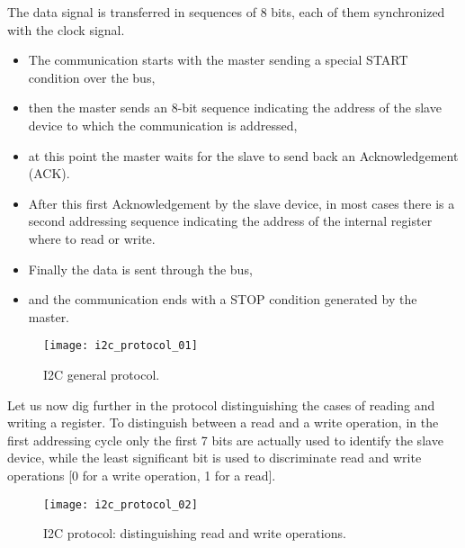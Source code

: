 The data signal is transferred in sequences of 8 bits, each of them synchronized with the clock signal.
\begin{itemize}
	\item The communication starts with the master sending a special START condition over the bus,
	\item then the master sends an 8-bit sequence indicating the address of the slave device to which the communication is addressed,
	\item at this point the master waits for the slave to send back an Acknowledgement (ACK).
	\item After this first Acknowledgement by the slave device, in most cases there is a second addressing sequence indicating the address of the internal register where to read or write.
	\item Finally the data is sent through the bus,
	\item and the communication ends with a STOP condition generated by the master.
\end{itemize}
\begin{figure}[!ht]
	\texttt{[image: i2c\_protocol\_01]}
	\captionsetup{justification=centering, margin=1.5cm}
	\centering
	\caption{I2C general protocol.}
	\centering
\end{figure}

Let us now dig further in the protocol distinguishing the cases of reading and writing a register. To distinguish between a read and a write operation, in the first addressing cycle only the first 7 bits are actually used to identify the slave device, while the least significant bit is used to discriminate read and write operations [0 for a write operation, 1 for a read].
\begin{figure}[!ht]
	\texttt{[image: i2c\_protocol\_02]}
	\captionsetup{justification=centering, margin=1.5cm}
	\centering
	\caption{I2C protocol: distinguishing read and write operations.}
	\centering
\end{figure}

